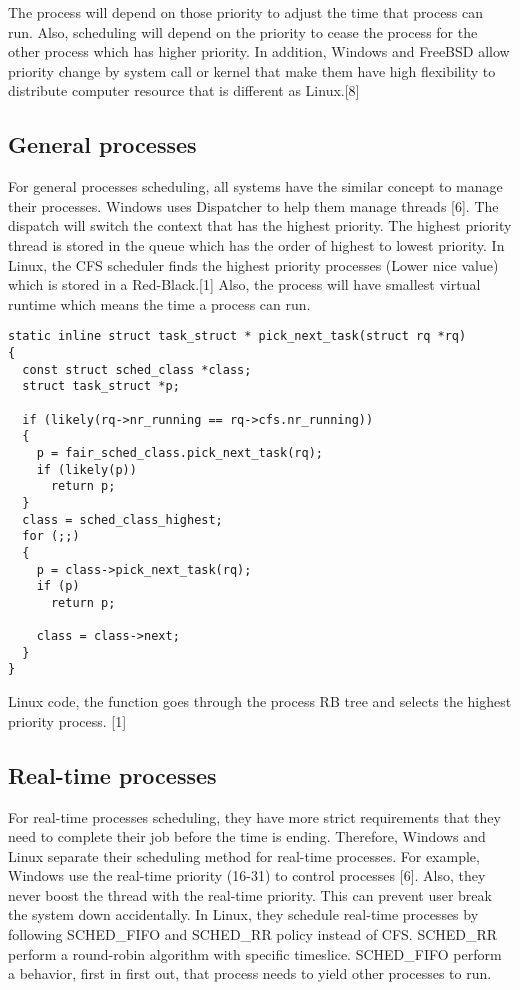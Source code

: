 \documentclass[letterpaper,draftclsnofoot,journal,compsoc,10pt,onecolumn]{IEEEtran}
\begin{document}
The process will depend on those priority to adjust the time that process can run. Also, scheduling will depend on the priority to cease the process for the other process which has higher priority. In addition, Windows and FreeBSD allow priority change by system call or kernel that make them have high flexibility to distribute computer resource that is different as Linux.[8]\\
\subsection{General processes}
\indent For general processes scheduling, all systems have the similar concept to manage their processes. Windows uses Dispatcher to help them manage threads [6]. The dispatch will switch the context that has the highest priority. The highest priority thread is stored in the queue which has the order of highest to lowest priority. In Linux, the CFS scheduler finds the highest priority processes (Lower nice value) which is stored in a Red-Black.[1] Also, the process will have smallest virtual runtime which means the time a process can run.\\

\begin{lstlisting}[style=CStyle] 
static inline struct task_struct * pick_next_task(struct rq *rq)
{
  const struct sched_class *class;
  struct task_struct *p;
  
  if (likely(rq->nr_running == rq->cfs.nr_running))
  {
    p = fair_sched_class.pick_next_task(rq);
    if (likely(p))
      return p;
  }
  class = sched_class_highest;
  for (;;)
  {
    p = class->pick_next_task(rq);
    if (p)
      return p; 
      
    class = class->next;
  }
}
\end{lstlisting}
Linux code, the function goes through the process RB tree and selects the highest priority process. [1]

\subsection{Real-time processes}
\indent For real-time processes scheduling, they have more strict requirements that they need to complete their job before the time is ending. Therefore, Windows and Linux separate their scheduling method for real-time processes. For example, Windows use the real-time priority (16-31) to control processes [6]. Also, they never boost the thread with the real-time priority. This can prevent user break the system down accidentally. In Linux, they schedule real-time processes by following SCHED\_FIFO and SCHED\_RR policy instead of CFS. SCHED\_RR perform a round-robin algorithm with specific timeslice. SCHED\_FIFO perform a behavior, first in first out, that process needs to yield other processes to run.\\
\end{document}
